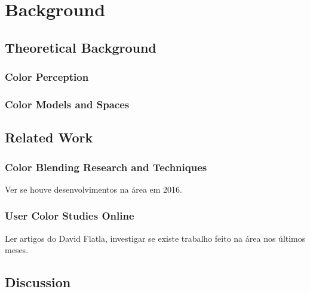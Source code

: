 
\chapter{Background}
\label{chapter:background}

\section{Theoretical Background}
\label{sec:theory_background}

\subsection{Color Perception}
\label{subsec:colorperception}

\subsection{Color Models and Spaces}
\label{subsec:colormodelspaces}

\section{Related Work}
\label{sec:related_work}

\subsection{Color Blending Research and Techniques}
\label{subsec:colorblending}
%
Ver se houve desenvolvimentos na área em 2016. \par
%
\subsection{User Color Studies Online}
\label{subsec:colorstudies}
%
Ler artigos do David Flatla, investigar se existe trabalho feito na área nos últimos meses. \par
%
\section{Discussion}
\label{sec:background_discussion}

